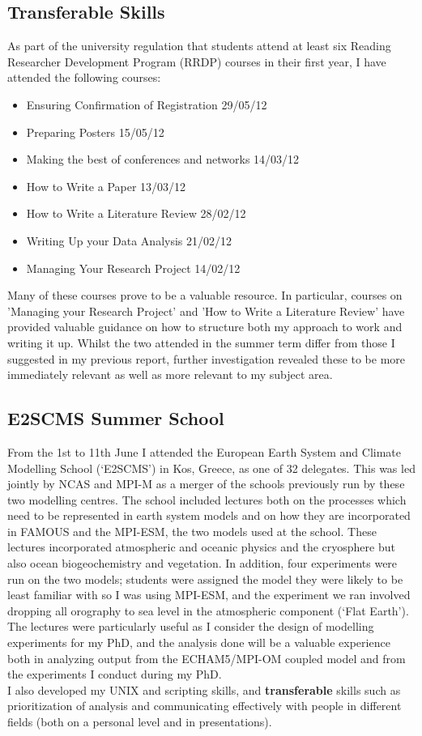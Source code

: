 \documentclass [11pt,a4paper,twosided] {report}
\begin{document}
\subsection*{{\bf Transferable} Skills}
As part of the university regulation that students attend at least six Reading Researcher Development Program (RRDP) courses in their first year, I have attended the following courses:
\begin{itemize}
\item Ensuring Confirmation of Registration 29/05/12
\item Preparing Posters 15/05/12
\item Making the best of conferences and networks 14/03/12
\item How to Write a Paper 13/03/12
\item How to Write a Literature Review 28/02/12
\item Writing Up your Data Analysis 21/02/12
\item Managing Your Research Project 14/02/12
\end{itemize}
Many of these courses prove to be a valuable resource. In particular, courses on 'Managing your Research Project' and 'How to Write a Literature Review' have provided valuable guidance on how to structure both my approach to work and writing it up. Whilst the two attended in the summer term differ from those I suggested in my previous report, further investigation revealed these to be more immediately relevant as well as more relevant to my subject area.

\subsection*{E2SCMS Summer School}
From the 1st to 11th June I attended the European Earth System and Climate Modelling School (`E2SCMS') in Kos, Greece, as one of 32 delegates. This was led jointly by NCAS and MPI-M as a merger of the schools previously run by these two modelling centres. The school included lectures both on the processes which need to be represented in earth system models and on how they are incorporated in FAMOUS and the MPI-ESM, the two models used at the school. These lectures incorporated atmospheric and oceanic physics and the cryosphere but also ocean biogeochemistry and vegetation. In addition, four experiments were run on the two models; students were assigned the model they were likely to be least familiar with so I was using MPI-ESM, and the experiment we ran involved dropping all orography to sea level in the atmospheric component (`Flat Earth'). The lectures were particularly useful as I consider the design of modelling experiments for my PhD, and the analysis done will be a valuable experience both in analyzing output from the ECHAM5/MPI-OM coupled model and from the experiments I conduct during my PhD.\\
I also developed my UNIX and scripting skills, and {\bf transferable} skills such as prioritization of analysis and communicating effectively with people in different fields (both on a personal level and in presentations).\\
\end{document}
